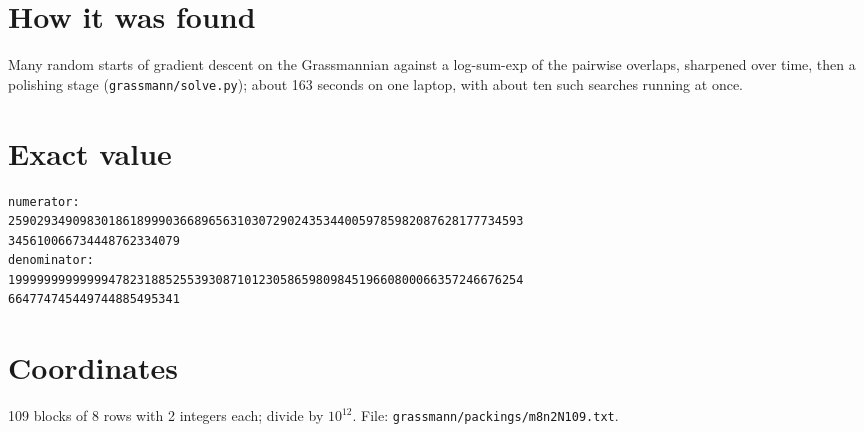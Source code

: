 \documentclass[11pt,a4paper]{article}
\begin{document}
\section{How it was found}
Many random starts of gradient descent on the Grassmannian against a log-sum-exp of the pairwise overlaps, sharpened over time, then a polishing stage (\texttt{grassmann/solve.py}); about 163 seconds on one laptop, with about ten such searches running at once.


\appendix
\section{Exact value}
{\small
\begin{verbatim}
numerator:
259029349098301861899903668965631030729024353440059785982087628177734593
345610066734448762334079
denominator:
199999999999994782318852553930871012305865980984519660800066357246676254
664774745449744885495341
\end{verbatim}}

\section{Coordinates}
109 blocks of 8 rows with 2 integers each; divide by $10^{12}$. File: \texttt{grassmann/packings/m8n2N109.txt}.
{\tiny
\begin{multicols}{4}
\end{multicols}}
\end{document}
